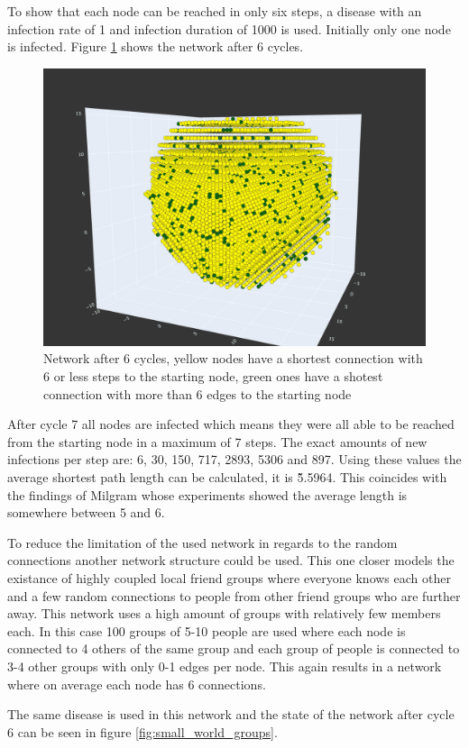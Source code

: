 To show that each node can be reached in only six steps, a disease with an infection rate
of 1 and infection duration of 1000 is used. Initially only one
node is infected. Figure \ref{fig:small_world_network} shows the network after 6 cycles.

\begin{figure}
    \centering
    \includegraphics[width=0.5\linewidth]{images/small_world_network.png}
    \caption{Network after 6 cycles, yellow nodes have a shortest connection with 6 or less steps to the starting node,
    green ones have a shotest connection with more than 6 edges to the starting node}
    \label{fig:small_world_network}
\end{figure}

After cycle 7 all nodes are infected which means they were all able to be reached from the 
starting node in a maximum of 7 steps. The exact amounts of new infections per step are:
6, 30, 150, 717, 2893, 5306 and 897. Using these values the average shortest path length
can be calculated, it is \~5.5964. This coincides with the findings of Milgram \cite{smallWorld}
whose experiments showed the average length is somewhere between 5 and 6.

To reduce the limitation of the used network in regards to the random connections another
network structure could be used. This one closer models the existance of highly coupled
local friend groups where everyone knows each other and a few random connections to people
from other friend groups who are further away. This network uses a high amount of
groups with relatively few members each. In this case 100 groups of 5-10 people are used
where each node is connected to 4 others of the same group and each group of people is
connected to 3-4 other groups with only 0-1 edges per node. This again results in a network
where on average each node has 6 connections.

The same disease is used in this network and the state of the network after cycle 6
can be seen in figure \ref{fig:small_world_groups}.

